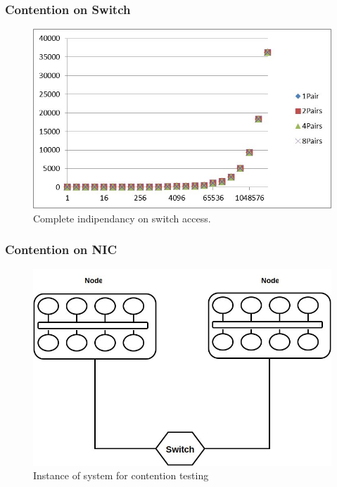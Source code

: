 \documentclass{beamer}
\begin{document}
\begin{frame}
\frametitle{Contention on Switch}

\begin{figure}
\includegraphics[width=.8\linewidth,height=\textheight,keepaspectratio]{image005.jpg}
\caption {Complete indipendancy on switch access.}
\end{figure}

\end{frame}
\begin{frame}
\frametitle{Contention on NIC}

\begin{figure}
\includegraphics[width=.8\linewidth,height=\textheight,keepaspectratio]{SYSTEM.jpg}
\caption {Instance of system for contention testing}
\end{figure}

\end{frame}
\end{document}
